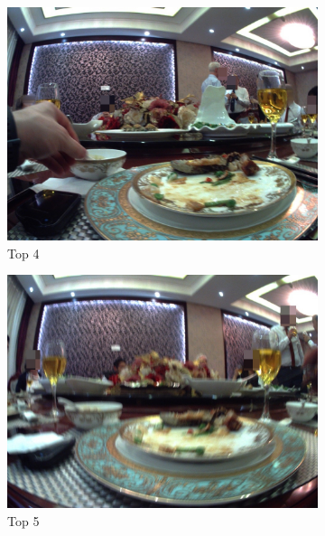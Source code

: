 \begin{figure}[H]
      \begin{subfigure}{0.32\textwidth}
        \includegraphics[width=\textwidth]{Sections/7Results/images/run2top4.jpg}\hfill
        \caption{Top 4}
      \end{subfigure}
      \begin{subfigure}{0.32\textwidth}
        \includegraphics[width=\textwidth]{Sections/7Results/images/run2top5.jpg}\hfill
        \caption{Top 5}
      \end{subfigure}
      \begin{subfigure}{0.32\textwidth}

\end{subfigure}
\end{figure}
